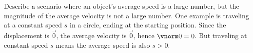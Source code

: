 {Describe a scenario where an object's average speed is a large number, but the magnitude of the average velocity is not a large number.
}
{
One example is traveling at a constant speed $s$ in a circle, ending at the starting position. Since the displacement is $\vec 0$, the average velocity is $\vec 0$, hence $\vnorm 0=0$. But traveling at constant speed $s$ means the average speed is also $s >0$.
}


